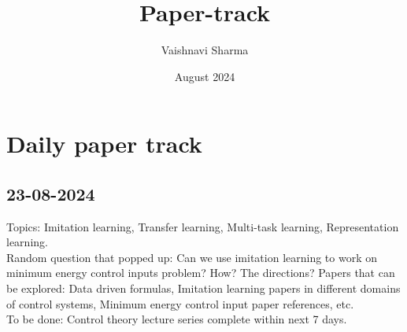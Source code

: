\documentclass{article}
\title{Paper-track}
\author{Vaishnavi Sharma}
\date{August 2024}
\begin{document}
\maketitle

\section{Daily paper track}
\subsection{23-08-2024}
Topics: Imitation learning, Transfer learning, Multi-task learning, Representation learning.\\

Random question that popped up: Can we use imitation learning to work on minimum energy control inputs problem? How? The directions?
Papers that can be explored: Data driven formulas, Imitation learning papers in different domains of control systems, Minimum energy control input paper references, etc.\\

To be done: Control theory lecture series complete within next 7 days.
\end{document}
